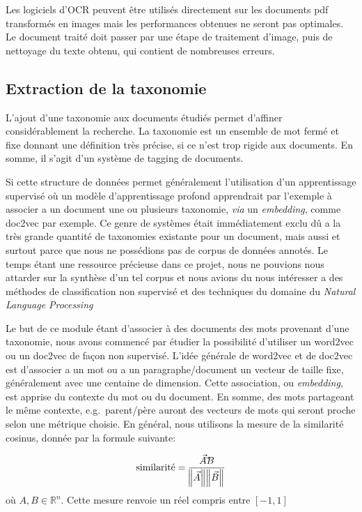Les logiciels d'OCR peuvent être utilisés directement sur les documents pdf transformés en images mais les performances obtenues ne seront pas optimales.
Le document traité doit passer par une étape de traitement d'image, puis de nettoyage du texte obtenu, qui contient de nombreuses erreurs.

\subsection{Extraction de la taxonomie}
L'ajout d'une taxonomie aux documents étudiés permet d'affiner considérablement la recherche.
La taxonomie est un ensemble de mot fermé et fixe donnant une définition très précise, si ce n'est trop rigide aux documents.
En somme, il s'agit d'un système de tagging de documents. 

Si cette structure de données permet généralement l'utilisation d'un apprentissage supervisé où un modèle d'apprentissage profond apprendrait par l'exemple à associer a un document une ou plusieurs taxonomie, \textit{via} un \textit{embedding}, comme doc2vec\cite{doc2vec} par exemple.
Ce genre de systèmes était immédiatement exclu dû a la très grande quantité de taxonomies existante pour un document, mais aussi et surtout parce que nous ne possédions pas de corpus de données annotés.
Le temps étant une ressource précieuse dans ce projet, nous ne pouvions nous attarder sur la synthèse d'un tel corpus et nous avions du nous intéresser a des méthodes de classification non supervisé et des techniques du domaine du \textit{Natural Language Processing}

Le but de ce module étant d'associer à des documents des mots provenant d'une taxonomie, nous avons commencé par étudier la possibilité d'utiliser un word2vec\cite{word2vec} ou un doc2vec de façon non supervisé.
L'idée générale de word2vec et de doc2vec est d'associer a un mot ou a un paragraphe/document un vecteur de taille fixe, généralement avec une centaine de dimension. Cette association, ou \textit{embedding}, est apprise du contexte du mot ou du document.
En somme, des mots partageant le même contexte, e.g.\ parent/père auront des vecteurs de mots qui seront proche selon une métrique choisie.
En général, nous utilisons la mesure de la similarité cosinus, donnée par la formule suivante:

\begin{equation}
	\text{similarité} = \frac{\vec{A} \dot \vec{B}}{\norm{\vec{A}}\norm{\vec{B}}}
\end{equation}
où $A, B  \in \mathbb{R}^n$. Cette mesure renvoie un réel compris entre $[-1, 1]$

